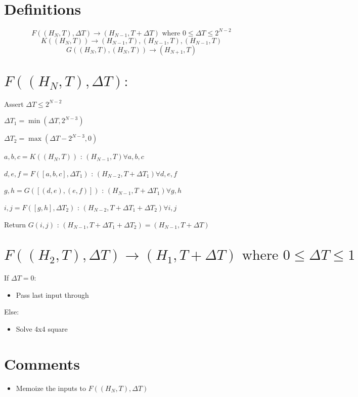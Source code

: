 \documentclass{article}
\newcommand{\ra}{\rightarrow}
\newcommand{\dt}{\Delta T}
\begin{document}
\section*{Definitions}
\[ F((H_N, T), \dt) \ra (H_{N-1}, T + \dt) \text{ where } 0 \le \dt \le 2^{N - 2} \]
\[ K((H_N, T)) \ra (H_{N-1}, T), (H_{N-1}, T), (H_{N-1}, T) \]
\[ G((H_N, T), (H_N, T)) \ra (H_{N + 1}, T) \]

\section*{$F((H_N, T), \dt):$}
Assert $\dt \le 2^{N - 2}$

$\dt_1 = \min(\dt, 2^{N - 3})$

$\dt_2 = \max(\dt - 2^{N - 3}, 0)$

$a, b, c = K((H_N, T))$ : $(H_{N - 1}, T) \forall a, b, c$

$d, e, f = F([a, b, c], \dt_1)$ : $(H_{N - 2}, T + \dt_1) \forall d, e, f$

$g, h = G([(d, e), (e, f)])$ : $(H_{N - 1}, T + \dt_1) \forall g, h$

$i, j = F([g, h], \dt_2)$ : $(H_{N - 2}, T + \dt_1 + \dt_2) \forall i, j$

Return $G(i, j)$ : $(H_{N - 1}, T + \dt_1 + \dt_2) = (H_{N - 1}, T + \dt)$

\section*{$F((H_2, T), \dt) \ra (H_1, T + \dt) \text{ where } 0 \le \dt \le 1$}
If $\dt = 0$:

\begin{itemize}
    \item Pass last input through
\end{itemize}

Else:
\begin{itemize}
    \item Solve 4x4 square
\end{itemize}


\section*{Comments}
\begin{itemize}
    \item Memoize the inputs to $F((H_N, T), \dt)$
\end{itemize}
\end{document}
